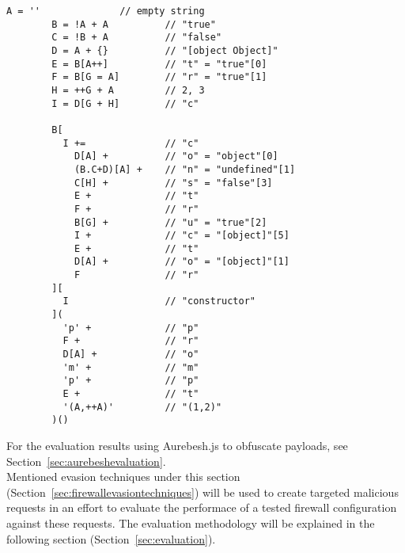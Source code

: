 \begin{lstlisting}[style=basicStyle, caption=Aurebesh.js obfuscation of prompt, label={lst:aurebeshprompt}]
		A = ''              // empty string
		B = !A + A          // "true"
		C = !B + A          // "false"
		D = A + {}          // "[object Object]"
		E = B[A++]          // "t" = "true"[0]
		F = B[G = A]        // "r" = "true"[1]
		H = ++G + A         // 2, 3
		I = D[G + H]        // "c"

		B[
		  I +=              // "c"
		    D[A] +          // "o" = "object"[0]
		    (B.C+D)[A] +    // "n" = "undefined"[1]
		    C[H] +          // "s" = "false"[3]
		    E +             // "t"
		    F +             // "r"
		    B[G] +          // "u" = "true"[2]
		    I +             // "c" = "[object]"[5]
		    E +             // "t"
		    D[A] +          // "o" = "[object]"[1]
		    F               // "r"
		][
		  I                 // "constructor"
		](
		  'p' +             // "p"
		  F +               // "r"
		  D[A] +            // "o"
		  'm' +             // "m"
		  'p' +             // "p"
		  E +               // "t"
		  '(A,++A)'         // "(1,2)"
		)()
\end{lstlisting}

For the evaluation results using Aurebesh.js to obfuscate payloads, see Section~\ref{sec:aurebeshevaluation}. \\

Mentioned evasion techniques under this section (Section~\ref{sec:firewallevasiontechniques}) will be used to create targeted malicious requests in an effort to evaluate the performace of a tested firewall configuration against these requests. The evaluation methodology will be explained in the following section (Section~\ref{sec:evaluation}).
